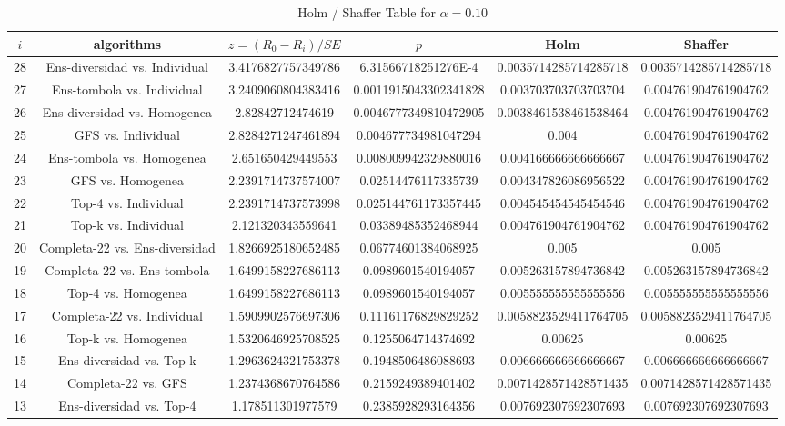 \documentclass[a4paper,10pt]{article}
\begin{document}
\begin{landscape}
\begin{table}[!htp]
\centering\tiny
\caption{Holm / Shaffer Table for $\alpha=0.10$}
\begin{tabular}{cccccc}
$i$&algorithms&$z=(R_0 - R_i)/SE$&$p$&Holm&Shaffer\\
\hline
28&Ens-diversidad vs. Individual&3.4176827757349786&6.31566718251276E-4&0.0035714285714285718&0.0035714285714285718\\
27&Ens-tombola vs. Individual&3.2409060804383416&0.0011915043302341828&0.003703703703703704&0.004761904761904762\\
26&Ens-diversidad vs. Homogenea&2.82842712474619&0.0046777349810472905&0.0038461538461538464&0.004761904761904762\\
25&GFS vs. Individual&2.8284271247461894&0.004677734981047294&0.004&0.004761904761904762\\
24&Ens-tombola vs. Homogenea&2.651650429449553&0.008009942329880016&0.004166666666666667&0.004761904761904762\\
23&GFS vs. Homogenea&2.2391714737574007&0.02514476117335739&0.004347826086956522&0.004761904761904762\\
22&Top-4 vs. Individual&2.2391714737573998&0.025144761173357445&0.004545454545454546&0.004761904761904762\\
21&Top-k vs. Individual&2.121320343559641&0.03389485352468944&0.004761904761904762&0.004761904761904762\\
20&Completa-22 vs. Ens-diversidad&1.8266925180652485&0.06774601384068925&0.005&0.005\\
19&Completa-22 vs. Ens-tombola&1.6499158227686113&0.0989601540194057&0.005263157894736842&0.005263157894736842\\
18&Top-4 vs. Homogenea&1.6499158227686113&0.0989601540194057&0.005555555555555556&0.005555555555555556\\
17&Completa-22 vs. Individual&1.5909902576697306&0.11161176829829252&0.0058823529411764705&0.0058823529411764705\\
16&Top-k vs. Homogenea&1.5320646925708525&0.1255064714374692&0.00625&0.00625\\
15&Ens-diversidad vs. Top-k&1.2963624321753378&0.1948506486088693&0.006666666666666667&0.006666666666666667\\
14&Completa-22 vs. GFS&1.2374368670764586&0.2159249389401402&0.0071428571428571435&0.0071428571428571435\\
13&Ens-diversidad vs. Top-4&1.178511301977579&0.2385928293164356&0.007692307692307693&0.007692307692307693\\

\end{tabular}
\end{table}
\end{landscape}
\end{document}
